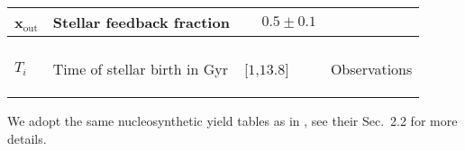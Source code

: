 \documentclass{aa}
\begin{document}
\begin{tiny}
\begin{table*}
\begin{minipage}{\textwidth}
\begin{center}
\begin{tabularx}{\textwidth}{ >{\raggedleft}p{2.2cm}p{6.5cm}|C{1.9cm}C{2.cm} }
  x$_\mathrm{out}$ & Stellar feedback fraction & $\phantom{-}0.5\pm0.1$ & \citep[Tab.\,1]{Rybizki_2017}\\
  
\hline
 \\
 
\hline
$T_i$ & Time of stellar birth in Gyr & [$1$,$13.8$] & Observations

\label{tab:priors}
\end{tabularx}
\end{center}
\end{minipage}
\end{table*}
\end{tiny}
%
We adopt the same nucleosynthetic yield tables as in \citep{Philcox_2019}, see their Sec.~2.2 for more details.
%
\end{document}
